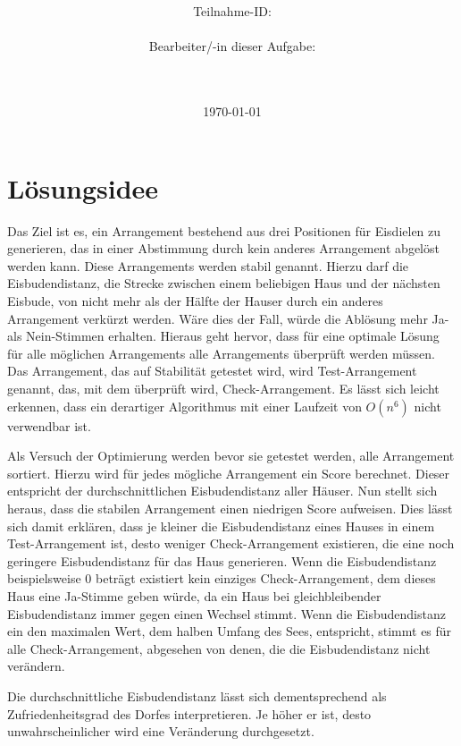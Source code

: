 \documentclass[a4paper,10pt,ngerman]{scrartcl}
\title{\textbf{\Huge\Aufgabe}}
\author{\LARGE Teilnahme-ID: \LARGE \TeilnahmeId \\\\
	    \LARGE Bearbeiter/-in dieser Aufgabe: \\ 
	    \LARGE \Name\\\\}
\date{\LARGE\today}
\begin{document}
\maketitle
\tableofcontents

\vspace{0.5cm}

\section{Lösungsidee}
Das Ziel ist es, ein Arrangement bestehend aus drei Positionen für Eisdielen zu generieren, das in einer Abstimmung durch kein anderes Arrangement abgelöst werden kann.
Diese Arrangements werden stabil genannt.
Hierzu darf die Eisbudendistanz, die Strecke zwischen einem beliebigen Haus und der nächsten Eisbude, von nicht mehr als der Hälfte der Hauser durch ein anderes Arrangement verkürzt werden.
Wäre dies der Fall, würde die Ablösung mehr Ja- als Nein-Stimmen erhalten.
Hieraus geht hervor, dass für eine optimale Lösung für alle möglichen Arrangements alle Arrangements überprüft werden müssen.
Das Arrangement, das auf Stabilität getestet wird, wird Test-Arrangement genannt, das, mit dem überprüft wird, Check-Arrangement.
Es lässt sich leicht erkennen, dass ein derartiger Algorithmus mit einer Laufzeit von $O(n^6)$ nicht verwendbar ist.

Als Versuch der Optimierung werden bevor sie getestet werden, alle Arrangement sortiert.
Hierzu wird für jedes mögliche Arrangement ein Score berechnet.
Dieser entspricht der durchschnittlichen Eisbudendistanz aller Häuser.
Nun stellt sich heraus, dass die stabilen Arrangement einen niedrigen Score aufweisen.
Dies lässt sich damit erklären, dass je kleiner die Eisbudendistanz eines Hauses in einem Test-Arrangement ist, desto weniger Check-Arrangement existieren, die eine noch geringere Eisbudendistanz für das Haus generieren.
Wenn die Eisbudendistanz beispielsweise $0$ beträgt existiert kein einziges Check-Arrangement, dem dieses Haus eine Ja-Stimme geben würde, da ein Haus bei gleichbleibender Eisbudendistanz immer gegen einen Wechsel stimmt.
Wenn die Eisbudendistanz ein den maximalen Wert, dem halben Umfang des Sees, entspricht, stimmt es für alle Check-Arrangement, abgesehen von denen, die die Eisbudendistanz nicht verändern.

Die durchschnittliche Eisbudendistanz lässt sich dementsprechend als \glqq Zufriedenheitsgrad\grqq{} des Dorfes interpretieren.
Je höher er ist, desto unwahrscheinlicher wird eine Veränderung durchgesetzt.
\end{document}
